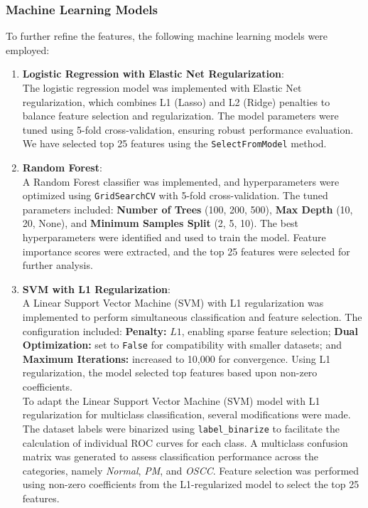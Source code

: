 \documentclass[a4paper,12pt]{article}
\begin{document}
\subsubsection{Machine Learning Models}
To further refine the features, the following machine learning models were employed:
\begin{enumerate}
	\item \textbf{Logistic Regression with Elastic Net Regularization}:\\
	      The logistic regression model was implemented with Elastic Net regularization, which combines L1 (Lasso) and L2 (Ridge) penalties to balance feature selection and regularization. The model parameters were tuned using 5-fold cross-validation, ensuring robust performance evaluation. We have selected top 25 features using the \texttt{SelectFromModel} method.
	\item \textbf{Random Forest}:\\
	      A Random Forest classifier was implemented, and hyperparameters were optimized using \texttt{GridSearchCV} with 5-fold cross-validation. The tuned parameters included: \textbf{Number of Trees} (100, 200, 500), \textbf{Max Depth} (10, 20, None), and \textbf{Minimum Samples Split} (2, 5, 10). The best hyperparameters were identified and used to train the model. Feature importance scores were extracted, and the top 25 features were selected for further analysis.

	\item \textbf{SVM with L1 Regularization}:\\
	      A Linear Support Vector Machine (SVM) with L1 regularization was implemented to perform simultaneous classification and feature selection. The configuration included: \textbf{Penalty:} \(L1\), enabling sparse feature selection; \textbf{Dual Optimization:} set to \texttt{False} for compatibility with smaller datasets; and \textbf{Maximum Iterations:} increased to 10,000 for convergence. Using L1 regularization, the model selected top features based upon non-zero coefficients.\\
	      \hspace*{2em}To adapt the Linear Support Vector Machine (SVM) model with L1 regularization for multiclass classification, several modifications were made. The dataset labels were binarized using \texttt{label\_binarize} to facilitate the calculation of individual ROC curves for each class. A multiclass confusion matrix was generated to assess classification performance across the categories, namely \textit{Normal}, \textit{PM}, and \textit{OSCC}. Feature selection was performed using non-zero coefficients from the L1-regularized model to select the top 25 features.



\end{enumerate}
\end{document}

